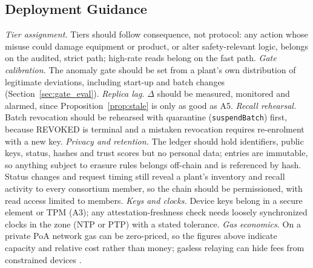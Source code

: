 \subsection{Deployment Guidance}
\emph{Tier assignment.} Tiers should follow consequence, not protocol: any action whose misuse could damage equipment or product, or alter safety-relevant logic, belongs on the audited, strict path; high-rate reads belong on the fast path. \emph{Gate calibration.} The anomaly gate should be set from a plant's own distribution of legitimate deviations, including start-up and batch changes (Section~\ref{sec:gate_eval}). \emph{Replica lag.} $\Delta$ should be measured, monitored and alarmed, since Proposition~\ref{prop:stale} is only as good as A5. \emph{Recall rehearsal.} Batch revocation should be rehearsed with quarantine (\texttt{suspendBatch}) first, because REVOKED is terminal and a mistaken revocation requires re-enrolment with a new key. \emph{Privacy and retention.} The ledger should hold identifiers, public keys, status, hashes and trust scores but no personal data; entries are immutable, so anything subject to erasure rules belongs off-chain and is referenced by hash. Status changes and request timing still reveal a plant's inventory and recall activity to every consortium member, so the chain should be permissioned, with read access limited to members. \emph{Keys and clocks.} Device keys belong in a secure element or TPM (A3); any attestation-freshness check needs loosely synchronized clocks in the zone (NTP or PTP) with a stated tolerance. \emph{Gas economics.} On a private PoA network gas can be zero-priced, so the figures above indicate capacity and relative cost rather than money; gasless relaying can hide fees from constrained devices \cite{madhwal2025gasless}.

